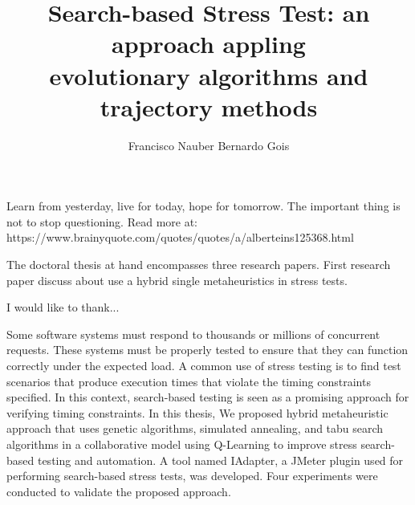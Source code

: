 \documentclass{report}
\begin{document}
\title{Search-based Stress Test: an approach appling \\ evolutionary algorithms and trajectory methods}
\author{Francisco Nauber Bernardo Gois}



\beforepreface

\clearpage

Learn from yesterday, live for today, hope for tomorrow. The important thing is not to stop questioning.
Read more at: https://www.brainyquote.com/quotes/quotes/a/alberteins125368.html



The doctoral thesis at hand encompasses three research papers. First research paper discuss about use a hybrid single metaheuristics  in stress tests.



I would like to thank...







\setlength{\parindent}{16pt}
\begin{center}
\begin{minipage}{.7\linewidth}
Some software systems must respond to thousands or millions of concurrent requests. These systems must be properly tested to ensure that they can function correctly under the expected load. A common use of stress testing is to find test scenarios that produce execution times that violate the timing constraints specified. In this context, search-based testing is seen as a promising approach for verifying timing constraints. In this thesis, We proposed  hybrid metaheuristic approach that uses genetic algorithms, simulated annealing, and tabu search algorithms in a collaborative model using Q-Learning to improve stress search-based  testing and  automation. A tool named IAdapter, a JMeter plugin used for performing search-based stress tests, was developed. Four experiments were conducted to validate the proposed approach.\bigskip\\
\end{minipage}
\end{center}
\end{document}
